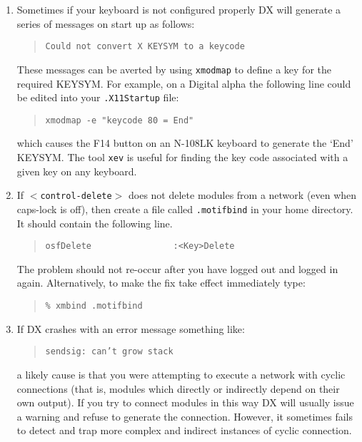 \begin{enumerate}
  \begin{quote}
   {\tt ps aux | grep dx}
  \end{quote}

  \item Sometimes if your keyboard is not configured properly DX will
   generate a series of messages on start up as follows:

  \begin{quote}
   {\tt Could not convert X KEYSYM to a keycode}
  \end{quote}

   These messages can be averted by using {\tt xmodmap} to define a key
   for the required KEYSYM. For example, on a Digital alpha the following
   line could be edited into your {\tt .X11Startup} file:

  \begin{quote}
   {\tt xmodmap -e "keycode 80 = End"}
  \end{quote}

   which causes the F14 button on an N-108LK keyboard to generate the
   `End' KEYSYM. The tool {\tt xev} is useful for finding the key code 
   associated with a given key on any keyboard.

  \item If {\tt $<$control-delete$>$} does not delete modules from a
   network (even when caps-lock is off), then create a file called
   {\tt .motifbind} in your home directory. It should contain the
   following line.

  \begin{quote}
   \verb-osfDelete                :<Key>Delete-
  \end{quote}

   The problem should not re-occur after you have logged out and
   logged in again.  Alternatively, to make the fix take effect
   immediately type:

  \begin{quote}
   {\tt \% xmbind .motifbind}
  \end{quote}

  \item If DX crashes with an error message something like:

  \begin{quote}
   {\tt sendsig: can't grow stack}
  \end{quote}

   a likely cause is that you were attempting to execute a network
   with cyclic connections (that is, modules which directly or
   indirectly depend on their own output). If you try to connect modules
   in this way DX will usually issue a warning and refuse to generate
   the connection. However, it sometimes fails to detect and trap
   more complex and indirect instances of cyclic connection.

\end{enumerate}


